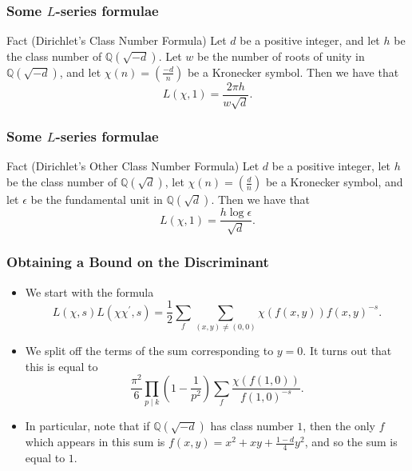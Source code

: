 \documentclass[handout]{beamer}
\newcommand{\legendre}[2]{\ensuremath{\left(\frac{#1}{#2}\right)}}
\begin{document}
\begin{frame}

	\frametitle{Some $L$-series formulae}

	\begin{block}{Fact (Dirichlet's Class Number Formula)}
		Let $d$ be a positive integer, and let $h$ be the class number of $\mathbb{Q}(\sqrt{-d})$. Let $w$ be the number of roots of unity in $\mathbb{Q}(\sqrt{-d})$, and let $\chi(n) = \legendre{-d}{n}$ be a Kronecker symbol. Then we have that
		\[
			L(\chi, 1) = \frac{2 \pi h}{w \sqrt{d}}.
		\]
	\end{block}

\end{frame}

\begin{frame}

	\frametitle{Some $L$-series formulae}

	\begin{block}{Fact (Dirichlet's Other Class Number Formula)}
		Let $d$ be a positive integer, let $h$ be the class number of $\mathbb{Q}(\sqrt{d})$, let $\chi(n) = \legendre{d}{n}$ be a Kronecker symbol, and let $\epsilon$ be the fundamental unit in $\mathbb{Q}(\sqrt{d})$. Then we have that
		\[
			L(\chi, 1) = \frac{h \log \epsilon}{\sqrt{d}}.
		\]
	\end{block}
\end{frame}


\begin{frame}
	
	\frametitle{Obtaining a Bound on the Discriminant}

	\begin{itemize}
		
		\item We start with the formula
			\[
				L(\chi, s)L(\chi \chi^\prime, s) = \frac{1}{2} \sum_{f} \sum_{(x, y) \neq (0, 0)} \chi(f(x, y)) {f(x, y)}^{-s}.
			\]
			\pause

		\item We split off the terms of the sum corresponding to $y = 0$. It turns out that this is equal to
			\[
				\frac{\pi^2}{6} \prod_{p \mid k} \left(1 - \frac{1}{p^2} \right) \sum_{f} \frac{\chi(f(1, 0))}{{f(1, 0)}^{-s}}.
			\]
			\pause

		\item In particular, note that if $\mathbb{Q}(\sqrt{-d})$ has class number $1$, then the only $f$ which appears in this sum is $f(x, y) = x^2 + xy + \frac{1 - d}{4} y^2$, and so the sum is equal to $1$.

	\end{itemize}

\end{frame}
\end{document}
